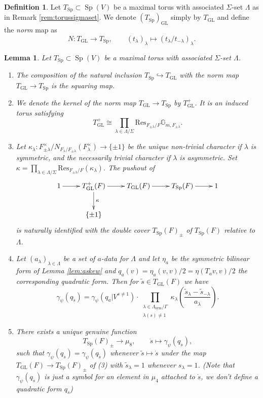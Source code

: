 \documentclass{article}
\def\mb#1{\mathbb{#1}}
\def\tx#1{\textrm{#1}}
\DeclareMathOperator{\Sp}{Sp}
\DeclareMathOperator{\GL}{GL}
\newtheorem{lem}[thm]{Lemma}
\theoremstyle{definition}
\newtheorem{dfn}[thm]{Definition}
\numberwithin{equation}{subsection}
\renewcommand{\-}{\hyp{}}
\begin{document}
\begin{dfn} Let $T_{\Sp} \subset \Sp(V)$ be a maximal torus with associated $\Sigma$-set $\Lambda$ as in Remark \ref{rem:torussigmaset}. We denote $(T_{\Sp})_{\GL}$ simply by $T_{\GL}$ and define the \emph{norm} map as 
	\[ N : T_{\GL} \to T_{\Sp},\qquad (t_\lambda)_\lambda \mapsto (t_\lambda/t_{-\lambda})_\lambda. \]
\end{dfn}


\begin{lem} \label{lem:topssgamma}
	Let $T_{\Sp} \subset \Sp(V)$ be a maximal torus with associated $\Sigma$-set $\Lambda$.
	\begin{enumerate}
		\item The composition of the natural inclusion $T_{\Sp} \hookrightarrow T_{\GL}$ with the norm map $T_{\GL} \to T_{\Sp}$ is the squaring map.
		\item We denote the kernel of the norm map $T_{\GL} \to T_{\Sp}$ by $T_{\GL}^+$. It is an induced torus satisfying
		\[ T_{\GL}^+ \cong \prod_{\lambda \in \Lambda/\Sigma} \tx{Res}_{F_{\pm\lambda}/F}\mb{G}_{m,F_{\pm\lambda}}. \]
		\item Let $\kappa_\lambda : F_{\pm\lambda}^\times/N_{F_\lambda/F_{\pm\lambda}}(F_\lambda^{\times}) \to \{\pm1\}$ be the unique non-trivial character if $\lambda$ is symmetric, and the necessarily trivial character if $\lambda$ is asymmetric. Set $\kappa=\prod_{\lambda \in \Lambda/\Sigma} \tx{Res}_{F_{\pm\lambda}/F}(\kappa_\lambda)$. 
		The pushout of
		\[ \xymatrix{1 \ar[r]&T_{\GL}^+(F)\ar[r]\ar[d]^\kappa& T_{\GL}(F)\ar[r]& T_{\Sp}(F) \ar[r]&1\\
		&\{\pm1\}
		}\]
		is naturally identified with the double cover $T_{\Sp}(F)_\pm$ of $T_{\Sp}(F)$ relative to $\Lambda$.
		\item Let $(a_\lambda)_{\lambda \in \Lambda}$ be a set of $a$-data for $\Lambda$ and let $\eta_a$ be the symmetric bilinear form of Lemma \ref{lem:askew} and $q_a(v)=\eta_a(v,v)/2=\eta(T_av,v)/2$ the corresponding quadratic form. Then for  $\tilde s \in T_{\GL}(F)$ we have
		\[ \gamma_\psi(q_{\tilde s}) = \gamma_\psi(q_a|V^{s \neq 1}) \cdot \prod_{\substack{\lambda \in \Lambda_\tx{sym}/\Gamma\\ \lambda(s) \neq 1}} \kappa_\lambda\left(\frac{\tilde s_\lambda-\tilde s_{-\lambda}}{a_\lambda}\right). \]
		\item There exists a unique genuine function \[ T_{\Sp}(F)_\pm \to \mu_8,\qquad \dot s \mapsto \gamma_\psi(q_{\dot s}), \]
		such that $\gamma_\psi(q_{\dot s})=\gamma_\psi(q_{\tilde s})$ whenever $\tilde s \mapsto \dot s$ under the map $T_{\GL}(F) \to T_{\Sp}(F)_\pm$ of (3) with $\tilde s_\lambda=1$ whenever $s_\lambda = 1$. (Note that $\gamma_\psi(q_{\dot s})$ is just a symbol for an element in $\mu_4$ attached to $\dot s$, we don't define a quadratic form $q_{\dot s}$)
	\end{enumerate}
\end{lem} 
\end{document}
